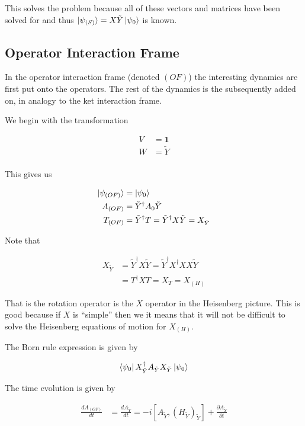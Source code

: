 \documentclass[12pt]{article}
\newcommand{\ddt}[1]{\frac{d #1}{dt}}
\newcommand{\ppt}[1]{\frac{\partial #1}{\partial t}}
\newcommand{\bv}[1]{\boldsymbol{#1}}
\begin{document}
This solves the problem because all of these vectors and matrices have been solved for and thus $\ket{\psi_{(S)}} = X\tilde{Y}\ket{\psi_0}$ is known.

\subsection{Operator Interaction Frame}

In the operator interaction frame (denoted $(OF)$) the interesting dynamics are first put onto the operators. The rest of the dynamics is the subsequently added on, in analogy to the ket interaction frame.

We begin with the transformation

\begin{align}
V &= \bv{1}\\
W &= \tilde{Y}\\
\end{align}

This gives us

\begin{align}
\ket{\psi_{(OF)}} &= \ket{\psi_0}\\
A_{(OF)} &= \tilde{Y}^{\dag}A_0\tilde{Y}\\
T_{(OF)} &= \tilde{Y}^{\dag} T = \tilde{Y}^{\dag} X \tilde{Y} = X_{\tilde{Y}}
\end{align}

Note that

\begin{align}
X_{\tilde{Y}} &= \tilde{Y}^{\dag} X \tilde{Y} = \tilde{Y}^{\dag} X^{\dag} X X \tilde{Y}\\
&= T^{\dag} X T = X_T = X_{(H)}
\end{align}

That is the rotation operator is the $X$ operator in the Heisenberg picture. This is good because if $X$ is ``simple'' then we it means that it will not be difficult to solve the Heisenberg equations of motion for $X_{(H)}$.

The Born rule expression is given by

\begin{align}
\bra{\psi_0} X_{\tilde{Y}}^{\dag} A_{\tilde{Y}} X_{\tilde{Y}} \ket{\psi_0}
\end{align}

The time evolution is given by

\begin{align}
\ddt{A_{(OF)}} &= \ddt{A_{\tilde{Y}}} = -i\left[A_{\tilde{Y}}, (H_{\tilde{Y}})_{\tilde{Y}}\right] + \ppt{A_{\tilde{Y}}}
\end{align}
\end{document}
